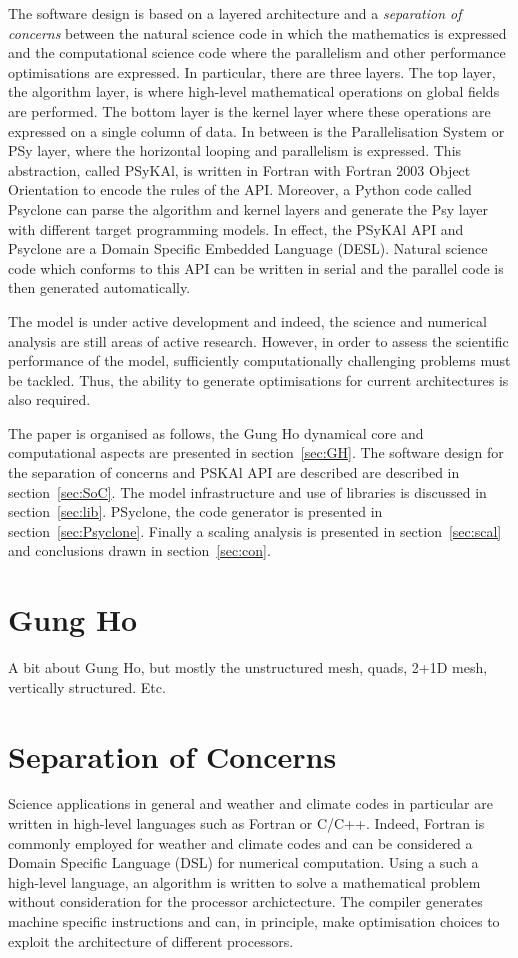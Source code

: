 \documentclass[times]{elsarticle}
\begin{document}
The software design is based on a layered architecture and a 
{\em separation of concerns} between the natural science code in which
the mathematics is expressed and the computational science code where the
parallelism and other performance optimisations are expressed. In particular,
there are three layers. The top layer, the algorithm layer, is where high-level mathematical 
operations on global fields are performed. The bottom layer is the kernel layer
where these operations are expressed on a single column of data. In between is the
Parallelisation System or PSy layer, where the horizontal looping and parallelism is
expressed. This abstraction, called PSyKAl, is written in Fortran with Fortran 2003
Object Orientation to encode the rules of the API.
Moreover, a Python code called Psyclone can parse the algorithm and kernel layers and
generate the Psy layer with different target programming models. In effect, the PSyKAl API
and Psyclone are a Domain Specific Embedded Language (DESL). Natural science code which
conforms to this API can be written in serial and the parallel code is then generated automatically.

The model is under active development and indeed, the science and
numerical analysis are still areas of active research. However, in
order to assess the scientific performance of the model, sufficiently
computationally challenging problems must be tackled. Thus, the
ability to generate optimisations for current architectures is also
required. 

The paper is organised as follows, the Gung Ho dynamical core and
computational aspects are presented in section~\ref{sec:GH}. The
software design for the separation of concerns and PSKAl API are described 
are described in section~\ref{sec:SoC}. The model infrastructure and
use of libraries is discussed in section~\ref{sec:lib}. PSyclone, the
code generator is presented in section~\ref{sec:Psyclone}. Finally a
scaling analysis is presented in section~\ref{sec:scal} and
conclusions drawn in section~\ref{sec:con}.

\section{\label{sec:GH}Gung Ho}
A bit about Gung Ho, but mostly the unstructured mesh, quads, 2+1D
mesh, vertically structured. Etc.

\section{\label{sec:SoC}Separation of Concerns}
Science applications in general and weather and climate codes in
particular are written in high-level languages such as Fortran or
C/C++. Indeed, Fortran is commonly employed for weather and climate
codes and can be considered a Domain Specific Language (DSL) for
numerical computation. Using a such a high-level language, an
algorithm is written to solve a mathematical problem without
consideration for the processor archictecture. The compiler generates
machine specific instructions and can, in principle, make optimisation
choices to exploit the architecture of different processors.
\end{document}
